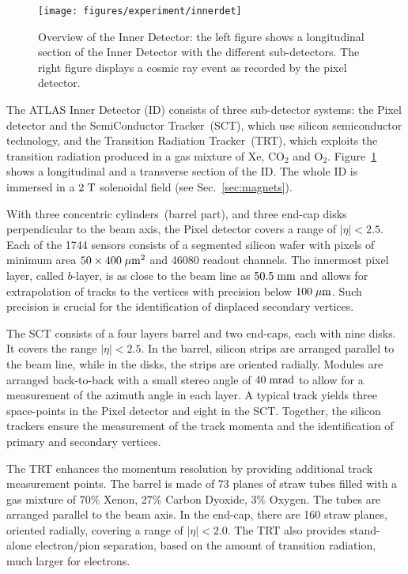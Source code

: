 \begin{figure}[ht]
\centering
\texttt{[image: figures/experiment/innerdet]}
\caption[Overview of the Inner Detector]{
  Overview of the Inner Detector: 
  the left figure shows a longitudinal section of the Inner Detector
  with the different sub-detectors.
  The right figure displays a cosmic ray event as recorded by the
  pixel detector.}
\label{fig:ID}
\end{figure}

The ATLAS Inner Detector (ID) consists of three sub-detector systems:
the Pixel detector and the SemiConductor Tracker~(SCT), which use
silicon semiconductor technology, and the Transition Radiation
Tracker~(TRT), which exploits the transition radiation produced in a
gas mixture of Xe, CO$_2$ and O$_2$.
Figure~\ref{fig:ID} shows a longitudinal and a transverse section of
the ID. The whole ID is immersed in a \mbox{$2 \; \mathrm{T}$} solenoidal field
(see Sec.~\ref{sec:magnets}).

With three concentric cylinders~(barrel part), and three end-cap disks
perpendicular to the beam axis, the Pixel detector covers a range of
\mbox{$|\eta| < 2.5$}.
Each of the 1744 sensors consists of a segmented silicon wafer with
pixels of minimum area \mbox{$50 \times 400 \; \mu\mathrm{m}^2$} and 46080 readout
channels. The innermost pixel layer, called $b$-layer, is as close to
the beam line as \mbox{$50.5 \; \mathrm{mm}$} and allows for extrapolation of
tracks to the vertices with precision below \mbox{$100 \; \mu\mathrm{m}$}.
Such precision is crucial for the identification of displaced
secondary vertices.

The SCT consists of a four layers barrel and two end-caps, each with
nine disks. It covers the range \mbox{$|\eta| < 2.5$}.
In the barrel, silicon strips are arranged parallel to the beam line,
while in the disks, the strips are oriented radially.
Modules are arranged back-to-back with a small stereo angle of
\mbox{$40 \; \mathrm{mrad}$} to allow for a measurement of the azimuth angle in
each layer. A typical track yields three space-points in the Pixel
detector and eight in the SCT. Together, the silicon trackers ensure
the measurement of the track momenta and the identification of primary
and secondary vertices. 

The TRT enhances the momentum resolution by providing additional track
measurement points.
The barrel is made of 73 planes of straw tubes filled with a gas
mixture of 70\% Xenon, 27\% Carbon Dyoxide, 3\% Oxygen. The tubes are
arranged parallel to the beam axis.
In the end-cap, there are 160 straw planes, oriented radially,
covering a range of \mbox{$|\eta| < 2.0$}. 
The TRT also provides stand-alone electron/pion separation, based on
the amount of transition radiation, much larger for electrons.

